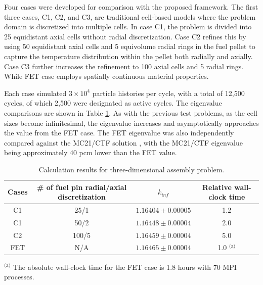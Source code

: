 Four cases were developed for comparison with the proposed framework. The first three cases, C1, C2, and C3, are traditional cell-based models where the problem domain is discretized into multiple cells. In case C1, the problem is divided into 25 equidistant axial cells without radial discretization. Case C2 refines this by using 50 equidistant axial cells and 5 equivolume radial rings in the fuel pellet to capture the temperature distribution within the pellet both radially and axially. Case C3 further increases the refinement to 100 axial cells and 5 radial rings. While FET case employs spatially continuous material properties.

Each case simulated $3 \times 10^4$ particle histories per cycle, with a total of 12,500 cycles, of which 2,500 were designated as active cycles. The eigenvalue comparisons are shown in Table \ref{tab31}. As with the previous test problems, as the cell sizes become infinitesimal, the eigenvalue increases and asymptotically approaches the value from the FET case. The FET eigenvalue was also independently compared against the MC21/CTF solution \cite{kelly_2017}, with the MC21/CTF eigenvalue being approximately 40 pcm lower than the FET value.

\begin{table}
    \centering
    \caption{Calculation results for three-dimensional assembly problem.}
    \label{tab31} 
    \begin{tabular}{| c | c | c | c | }
    \hline 
     Cases & \# of fuel pin radial/axial discretization & $k_{inf}$ & Relative wall-clock time \\
     \hline
     C1     & 25/1  & $1.16404\pm0.00005$ & 1.2      \\ \hline
     C1     & 50/2  & $1.16448\pm0.00004$ & 2.0      \\ \hline
     C2     & 100/5 & $1.16459\pm0.00004$ & 5.0      \\ \hline
     FET    & N/A   & $1.16465\pm0.00004$ & 1.0 $^\text{(a)}$      \\ \hline
    \end{tabular}
    \begin{flushleft}
        \small
        $^\text{(a)}$ The absolute wall-clock time for the FET case is 1.8 hours with 70 MPI processes. \\
    \end{flushleft}
\end{table}

